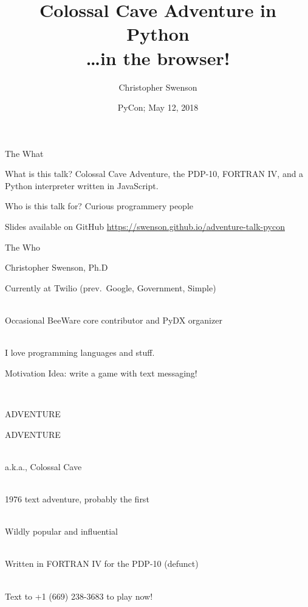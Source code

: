 \documentclass{beamer}
\title[Adventure]{Colossal Cave Adventure in Python\\ \dots in the browser!}
\author[@chris\_{}swenson]{Christopher Swenson}
\date[PyCon 2018]{PyCon; May 12, 2018}
\begin{document}
\begin{frame}
\titlepage
\end{frame}

\begin{frame}{The What}

\begin{block}{What is this talk?}
Colossal Cave Adventure, the PDP-10, FORTRAN IV, and a Python interpreter written in JavaScript.
\end{block}

\begin{block}{Who is this talk for?}
Curious programmery people
\end{block}

\begin{block}{Slides available on GitHub}
\url{https://swenson.github.io/adventure-talk-pycon}
\end{block}

\end{frame}

\begin{frame}{The Who}

\begin{block}{Christopher Swenson, Ph.D}

Currently at Twilio (prev.\ Google, Government, Simple)

\ \\

Occasional BeeWare core contributor and PyDX organizer

\ \\

I love programming languages and stuff.

\end{block}

\end{frame}

\begin{frame}{Motivation}
Idea: write a game with text messaging!

\ \\


\end{frame}

\begin{frame}{ADVENTURE}

ADVENTURE

\ \\

a.k.a., Colossal Cave

\ \\

1976 text adventure, probably the first

\ \\

Wildly popular and influential

\ \\

Written in FORTRAN IV for the PDP-10 (defunct)

\ \\

Text to +1 (669) 238-3683 to play now!

\end{frame}
\end{document}
